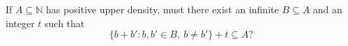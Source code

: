 If \(A\subseteq\mathbb N\) has positive upper density, must there
exist an infinite \(B\subseteq A\) and an integer \(t\) such that
\[
 \{b+b':b,b'\in B,\ b\ne b'\}+t\subseteq A?
\]

